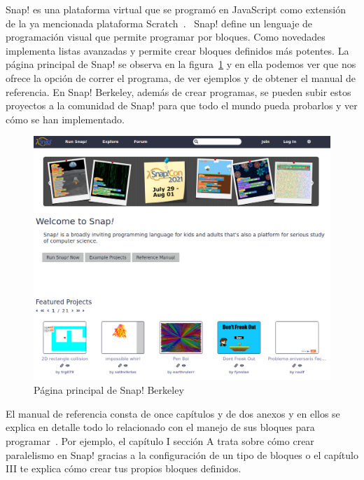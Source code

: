 \documentclass[a4paper, 12pt]{book}
\begin{document}
Snap! es una plataforma virtual que se programó en JavaScript como extensión de la ya mencionada plataforma Scratch~\cite{harvey2013snap}. ~Snap! define un lenguaje de programación visual que permite programar por bloques. Como novedades implementa listas avanzadas y permite crear bloques definidos  más potentes. La página principal de Snap! se observa en la figura~\ref{figura:ppal_snap} y en ella podemos ver que nos ofrece la opción de correr el programa, de ver ejemplos y de obtener el manual de referencia. En Snap! Berkeley, además de crear programas, se pueden subir estos proyectos a la comunidad de Snap! para que todo el mundo pueda probarlos y ver cómo se han implementado.
\begin{figure}[h]
        \centering
        \includegraphics[scale=0.4]{img/snap_ppal.png}
        \caption{Página principal de Snap! Berkeley}
        \label{figura:ppal_snap}
\end{figure}


El manual de referencia consta de once capítulos y de dos anexos y en ellos se explica en detalle todo lo relacionado con el manejo de sus bloques para programar~\cite{harvey2017snap}. Por ejemplo, el capítulo I sección A trata sobre cómo crear paralelismo en Snap! gracias a la configuración de un tipo de bloques o el capítulo III te explica cómo crear tus propios bloques definidos.
\end{document}
